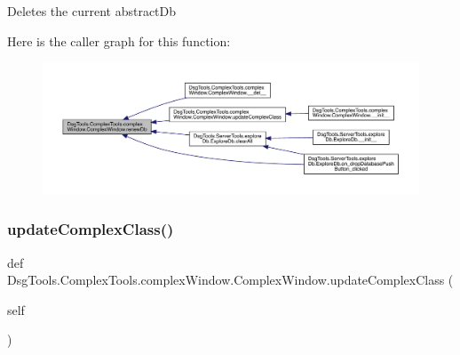 \begin{DoxyVerb}Deletes the current abstractDb
\end{DoxyVerb}
 Here is the caller graph for this function\+:
\nopagebreak
\begin{figure}[H]
\begin{center}
\leavevmode
\includegraphics[width=350pt]{class_dsg_tools_1_1_complex_tools_1_1complex_window_1_1_complex_window_a3be29012c77571d5328439ee89b8404d_icgraph}
\end{center}
\end{figure}
\mbox{\label{class_dsg_tools_1_1_complex_tools_1_1complex_window_1_1_complex_window_adae9aafc227935f7b346b95d2f8560fa}} 
\subsubsection{\texorpdfstring{update\+Complex\+Class()}{updateComplexClass()}}
{\footnotesize\ttfamily def Dsg\+Tools.\+Complex\+Tools.\+complex\+Window.\+Complex\+Window.\+update\+Complex\+Class (\begin{DoxyParamCaption}\item[{}]{self }\end{DoxyParamCaption})}

